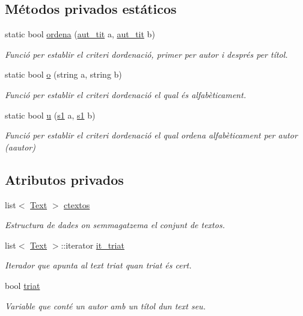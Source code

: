 \subsection*{Métodos privados estáticos}
\begin{DoxyCompactItemize}
\item 
static bool \hyperlink{class_cjt___textos_acc49a622df536569dd8b6cb527e5d84e}{ordena} (\hyperlink{struct_cjt___textos_1_1aut__tit}{aut\+\_\+tit} a, \hyperlink{struct_cjt___textos_1_1aut__tit}{aut\+\_\+tit} b)
\begin{DoxyCompactList}\small\item\em Funció per establir el criteri d\textquotesingle{}ordenació, primer per autor i després per títol. \end{DoxyCompactList}\item 
static bool \hyperlink{class_cjt___textos_a8eba85661f4ab2efb7108594bfdc2514}{o} (string a, string b)
\begin{DoxyCompactList}\small\item\em Funció per establir el criteri d\textquotesingle{}ordenació el qual és alfabèticament. \end{DoxyCompactList}\item 
static bool \hyperlink{class_cjt___textos_a586115f5b8f182038544ccc67dfc09bc}{u} (\hyperlink{struct_cjt___textos_1_1s1}{s1} a, \hyperlink{struct_cjt___textos_1_1s1}{s1} b)
\begin{DoxyCompactList}\small\item\em Funció per establir el criteri d\textquotesingle{}ordenació el qual ordena alfabèticament per autor (aautor) \end{DoxyCompactList}\end{DoxyCompactItemize}
\subsection*{Atributos privados}
\begin{DoxyCompactItemize}
\item 
list$<$ \hyperlink{class_text}{Text} $>$ \hyperlink{class_cjt___textos_a73503568d56e3a77949f720684916492}{ctextos}
\begin{DoxyCompactList}\small\item\em Estructura de dades on s\textquotesingle{}emmagatzema el conjunt de textos. \end{DoxyCompactList}\item 
list$<$ \hyperlink{class_text}{Text} $>$\+::iterator \hyperlink{class_cjt___textos_ab4e8c0ec60d6cd3d71c348926ed4d46a}{it\+\_\+triat}
\begin{DoxyCompactList}\small\item\em Iterador que apunta al text triat quan triat és cert. \end{DoxyCompactList}\item 
bool \hyperlink{class_cjt___textos_abc00e6c9c3b2d4ebfcfc4ad15e2646ed}{triat}
\begin{DoxyCompactList}\small\item\em Variable que conté un autor amb un títol d\textquotesingle{}un text seu. \end{DoxyCompactList}\end{DoxyCompactItemize}


